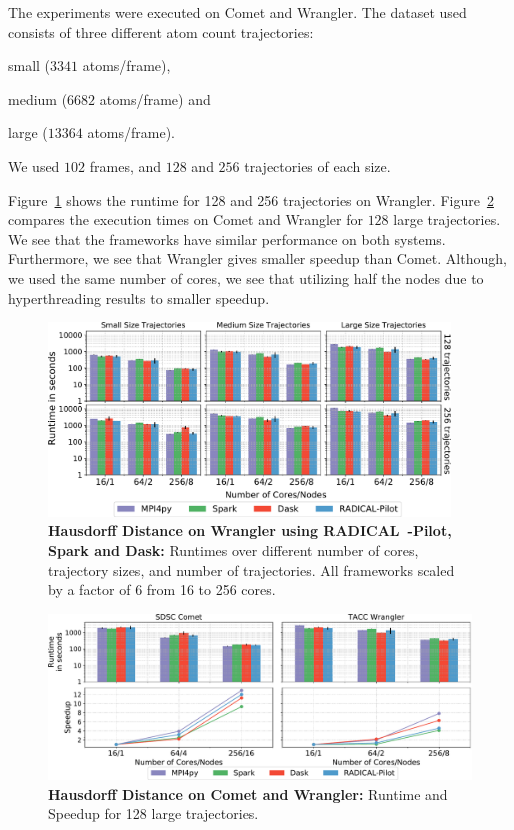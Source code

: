 The experiments were executed on Comet and Wrangler. 
The dataset used consists of three different atom count trajectories: 
\begin{inparaenum}
    \item small ($3341$ atoms/frame), 
    \item medium ($6682$ atoms/frame) and 
    \item large ($13364$ atoms/frame).
\end{inparaenum}
We used $102$ frames, and $128$ and $256$ trajectories of each size.

Figure~\ref{fig:HausdorffWrangler} shows the runtime for 128 and 256 trajectories on Wrangler.
Figure~\ref{fig:comet_wrangler_haus} compares the execution times on Comet and Wrangler for $128$ large trajectories.
We see that the frameworks have similar performance on both systems.
Furthermore, we see that Wrangler gives smaller speedup than Comet.
Although, we used the same number of cores, we see that utilizing half the nodes due to hyperthreading results to smaller speedup.

\begin{figure}[ht]
    \centering
    \includegraphics[width=0.95\textwidth]{figures/data_analytics_hpc/task_par/HausdorffSingleFig.pdf}
    \caption{\textbf{Hausdorff Distance on Wrangler using RADICAL~-Pilot, Spark and Dask:}
            Runtimes over different number of cores, trajectory sizes, and number of trajectories.
            All frameworks scaled by a factor of 6 from 16 to 256 cores.}
            \label{fig:HausdorffWrangler}
\end{figure}

\begin{figure}[t]
    \centering
    \includegraphics[width=.95\textwidth]{figures/data_analytics_hpc/task_par/comet_wrangler_haus.pdf}
    \caption{\textbf{Hausdorff Distance on Comet and Wrangler:}
    Runtime and Speedup for 128 large trajectories.} 
    \label{fig:comet_wrangler_haus}
\end{figure}

